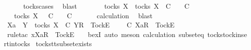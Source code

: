 \begin{isabellebody}
\ \ \ \ \isamarkupfalse%
\ tocks{\isachardot}cases\ \isamarkupfalse%
\ blast\isanewline
\ \ \isamarkupfalse%
\ \isamarkupfalse%
\ {\isachardoublequoteopen}{\isasymsigma}{\isacharprime}\ {\isasymin}\ tocks\ X\ {\isasymLongrightarrow}\ {\isasymexists}{\isasymrho}{\isacharprime}{\isasymin}tocks\ X{\isachardot}\ {\isasymrho}{\isacharprime}\ {\isasymsubseteq}\isactrlsub C\ {\isasymsigma}{\isacharprime}\ {\isasymand}\ {\isasymrho}{\isacharprime}\ {\isasymle}\isactrlsub C\ {\isasymrho}{\isachardoublequoteclose}\isanewline
\ \ \isamarkupfalse%
\ \isamarkupfalse%
\ {\isasymrho}{\isacharprime}\ \ {\isachardoublequoteopen}{\isasymrho}{\isacharprime}{\isasymin}tocks\ X\ {\isasymand}\ {\isasymrho}{\isacharprime}\ {\isasymsubseteq}\isactrlsub C\ {\isasymsigma}{\isacharprime}\ {\isasymand}\ {\isasymrho}{\isacharprime}\ {\isasymle}\isactrlsub C\ {\isasymrho}{\isachardoublequoteclose}\isanewline
\ \ \ \ \isamarkupfalse%
\ calculation\ \isamarkupfalse%
\ blast\isanewline
\ \ \isamarkupfalse%
\ \isamarkupfalse%
\ {\isachardoublequoteopen}Xa\ {\isasymsubseteq}\ Y\ {\isasymLongrightarrow}\ {\isasymexists}{\isasymrho}{\isacharprime}{\isasymin}tocks\ X{\isachardot}\ {\isasymrho}{\isacharprime}\ {\isasymsubseteq}\isactrlsub C\ {\isacharbrackleft}Y{\isacharbrackright}\isactrlsub R\ {\isacharhash}\ {\isacharbrackleft}Tock{\isacharbrackright}\isactrlsub E\ {\isacharhash}\ {\isasymsigma}{\isacharprime}\ {\isasymand}\ {\isasymrho}{\isacharprime}\ {\isasymle}\isactrlsub C\ {\isacharbrackleft}Xa{\isacharbrackright}\isactrlsub R\ {\isacharhash}\ {\isacharbrackleft}Tock{\isacharbrackright}\isactrlsub E\ {\isacharhash}\ {\isasymrho}{\isachardoublequoteclose}\isanewline
\ \ \ \ \isamarkupfalse%
\ {\isacharparenleft}rule{\isacharunderscore}tac\ x{\isacharequal}{\isachardoublequoteopen}{\isacharbrackleft}Xa{\isacharbrackright}\isactrlsub R\ {\isacharhash}\ {\isacharbrackleft}Tock{\isacharbrackright}\isactrlsub E\ {\isacharhash}\ {\isasymrho}{\isacharprime}{\isachardoublequoteclose}\ \ bexI{\isacharcomma}\ auto{\isacharcomma}\ meson\ calculation\ subset{\isacharunderscore}eq\ tocks{\isachardot}tock{\isacharunderscore}insert{\isacharunderscore}in{\isacharunderscore}tocks{\isacharparenright}\isanewline
{}\isamarkupfalse%
%
\endisatagproof
{\isafoldproof}%
%
\isadelimproof
\isanewline
%
\endisadelimproof
\isanewline
{}\isamarkupfalse%
\ tocks{\isacharunderscore}tt{\isacharunderscore}subset{\isacharunderscore}exists{}{\isacharcolon}\isanewline

\end{isabellebody}
